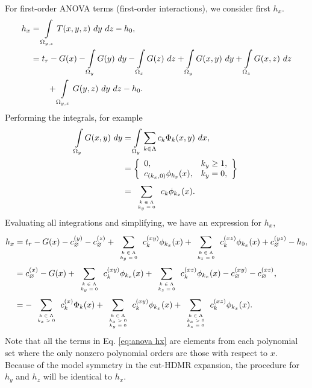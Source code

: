 For first-order ANOVA terms (first-order interactions), we consider first $h_x$.
\begin{align}
  h_x &= \int\limits_{\Omega_{y,z}} T(x,y,z)\ dy\ dz - h_0, \\ \nonumber
  &= t_r - G(x) - \int\limits_{\Omega_{y}} G(y)\ dy - \int\limits_{\Omega_{z}} G(z)\ dz + \int\limits_{\Omega_{y}} G(x,y)\ dy + \int\limits_{\Omega_{z}} G(x,z)\ dz \\ \nonumber
  & \hspace{20pt}+ \int\limits_{\Omega_{y,z}} G(y,z)\ dy\ dz - h_0.
\end{align}
Performing the integrals, for example
\begin{align}
  \int\limits_{\Omega_{y}} G(x,y)\ dy &= \int\limits_{\Omega_{y}} \sum_{k\in\Lambda} c_k\Phi_k(x,y)\ dx, \\ \nonumber
    &= \left\{\begin{array}{lr}
          0, & k_y \geq 1,\\
          c_{(k_x,0)}\phi_{k_x}(x), & k_y = 0,
       \end{array} \right\} \\ \nonumber
      &= \sum_{\tiny\begin{array}{c}k\in\Lambda\\k_y=0\end{array}}^{} c_k\phi_{k_x}(x).
\end{align}
Evaluating all integrations and simplifying, we have an expression for $h_x$,
\begin{align}\label{eq:anova hx}
  h_x &= t_r - G(x) - c^{(y)}_\varnothing - c^{(z)}_\varnothing + \sum_{\tiny\begin{array}{c}k\in\Lambda\\k_y=0\end{array}}^{} c^{(xy)}_k\phi_{k_x}(x) +
  \sum_{\tiny\begin{array}{c}k\in\Lambda\\k_z=0\end{array}}^{} c^{(xz)}_k\phi_{k_x}(x) + c^{(yz)}_\varnothing - h_0,\\ \nonumber
  &= c^{(x)}_\varnothing - G(x) + \sum_{\tiny\begin{array}{c}k\in\Lambda\\k_y=0\end{array}}^{} c^{(xy)}_k\phi_{k_x}(x) +
  \sum_{\tiny\begin{array}{c}k\in\Lambda\\k_z=0\end{array}}^{} c^{(xz)}_k\phi_{k_x}(x) - c^{(xy)}_\varnothing -
        c^{(xz)}_\varnothing, \\ \nonumber
  &= -\sum_{\tiny\begin{array}{c}k\in\Lambda\\k_x>0\end{array}}^{} c^{(x)}_k\Phi_k(x) + \sum_{\tiny\begin{array}{c}k\in\Lambda\\k_x>0\\k_y=0\end{array}}^{} c^{(xy)}_k\phi_{k_x}(x) +
  \sum_{\tiny\begin{array}{c}k\in\Lambda\\k_x>0\\k_z=0\end{array}}^{} c^{(xz)}_k\phi_{k_x}(x).
\end{align}
Note that all the terms in Eq. \ref{eq:anova hx} are elements from each polynomial set where the only nonzero polynomial
orders are those with respect to $x$.  Because of the model symmetry in the cut-HDMR expansion, the procedure
for $h_y$ and $h_z$ will be identical to $h_x$.

